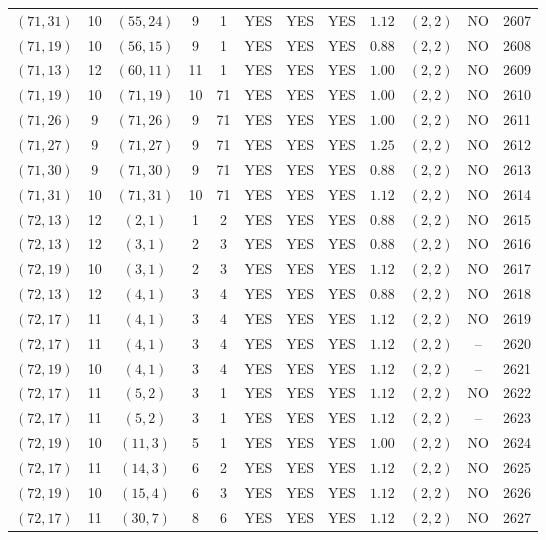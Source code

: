 \begin{longtable}{|c|c|c|c|c|c|c|c|c|c|c|c|}
$(71,31)$ & 10 & $(55,24)$ & 9 & 1 & YES & YES & YES & $1.12$ & $(2,2)$ & NO & 2607\\
$(71,19)$ & 10 & $(56,15)$ & 9 & 1 & YES & YES & YES & $0.88$ & $(2,2)$ & NO & 2608\\
$(71,13)$ & 12 & $(60,11)$ & 11 & 1 & YES & YES & YES & $1.00$ & $(2,2)$ & NO & 2609\\
$(71,19)$ & 10 & $(71,19)$ & 10 & 71 & YES & YES & YES & $1.00$ & $(2,2)$ & NO & 2610\\
$(71,26)$ & 9 & $(71,26)$ & 9 & 71 & YES & YES & YES & $1.00$ & $(2,2)$ & NO & 2611\\
$(71,27)$ & 9 & $(71,27)$ & 9 & 71 & YES & YES & YES & $1.25$ & $(2,2)$ & NO & 2612\\
$(71,30)$ & 9 & $(71,30)$ & 9 & 71 & YES & YES & YES & $0.88$ & $(2,2)$ & NO & 2613\\
$(71,31)$ & 10 & $(71,31)$ & 10 & 71 & YES & YES & YES & $1.12$ & $(2,2)$ & NO & 2614\\
$(72,13)$ & 12 & $(2,1)$ & 1 & 2 & YES & YES & YES & $0.88$ & $(2,2)$ & NO & 2615\\
$(72,13)$ & 12 & $(3,1)$ & 2 & 3 & YES & YES & YES & $0.88$ & $(2,2)$ & NO & 2616\\
$(72,19)$ & 10 & $(3,1)$ & 2 & 3 & YES & YES & YES & $1.12$ & $(2,2)$ & NO & 2617\\
$(72,13)$ & 12 & $(4,1)$ & 3 & 4 & YES & YES & YES & $0.88$ & $(2,2)$ & NO & 2618\\
$(72,17)$ & 11 & $(4,1)$ & 3 & 4 & YES & YES & YES & $1.12$ & $(2,2)$ & NO & 2619\\
$(72,17)$ & 11 & $(4,1)$ & 3 & 4 & YES & YES & YES & $1.12$ & $(2,2)$ & -- & 2620\\
$(72,19)$ & 10 & $(4,1)$ & 3 & 4 & YES & YES & YES & $1.12$ & $(2,2)$ & -- & 2621\\
$(72,17)$ & 11 & $(5,2)$ & 3 & 1 & YES & YES & YES & $1.12$ & $(2,2)$ & NO & 2622\\
$(72,17)$ & 11 & $(5,2)$ & 3 & 1 & YES & YES & YES & $1.12$ & $(2,2)$ & -- & 2623\\
$(72,19)$ & 10 & $(11,3)$ & 5 & 1 & YES & YES & YES & $1.00$ & $(2,2)$ & NO & 2624\\
$(72,17)$ & 11 & $(14,3)$ & 6 & 2 & YES & YES & YES & $1.12$ & $(2,2)$ & NO & 2625\\
$(72,19)$ & 10 & $(15,4)$ & 6 & 3 & YES & YES & YES & $1.12$ & $(2,2)$ & NO & 2626\\
$(72,17)$ & 11 & $(30,7)$ & 8 & 6 & YES & YES & YES & $1.12$ & $(2,2)$ & NO & 2627\\

\end{longtable}
